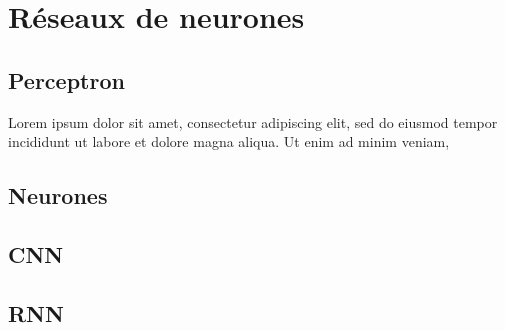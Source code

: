 	
	
	\section{Réseaux de neurones}
	\subsection{Perceptron}
	Lorem ipsum dolor sit amet, consectetur adipiscing elit, sed do eiusmod tempor incididunt ut labore et dolore magna aliqua. Ut enim ad minim veniam,
	\subsection{Neurones}
	\subsection{CNN}
	\subsection{RNN}
		